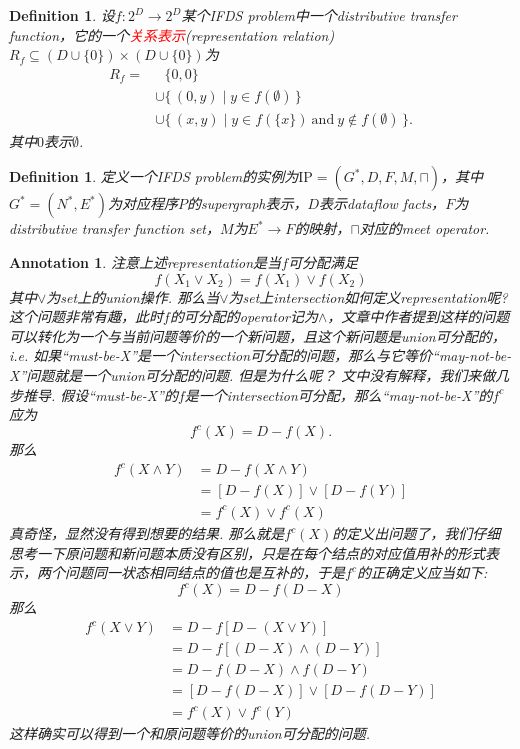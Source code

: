 \documentclass{article}
\newtheorem{definition}[theorem]{Definition}
\newtheorem{annotation}[theorem]{Annotation}
\newcommand*{\xfunc}[4]{{#2}\colon{#3}{#1}{#4}}
\newcommand*{\func}[3]{\xfunc{\to}{#1}{#2}{#3}}
\newcommand\Set[2]{\{\,#1\mid#2\,\}} %
\newcommand{\redt}[1]{\textcolor{red}{#1}}
\begin{document}
\begin{definition}
\rm 设$\func{f}{2^D}{2^D}$某个IFDS problem中一个distributive transfer function，它的一个\redt{关系表示}(representation relation) $R_f \subseteq (D \cup \{0\}) \times (D \cup \{0\})$为
$$
\begin{aligned}
R_f = &~~~ \{0,0\} \\
&\cup \Set{(0,y)}{y \in f(\emptyset)} \\ 
&\cup  \Set{(x,y)}{y \in f(\{x\})~\text{and}~y \notin f(\emptyset)}.
\end{aligned}
$$
其中$0$表示$\emptyset$. 
\end{definition}

\begin{definition}
\rm 定义一个IFDS problem的实例为$\text{IP}=(G^*,D,F,M,\sqcap)$，其中$G^*=(N^*,E^*)$为对应程序$P$的supergraph表示，$D$表示dataflow facts，$F$为distributive transfer function set，$M$为$E^* \to F$的映射，$\sqcap$对应的meet operator. 
\end{definition}

\begin{annotation}
\rm 注意上述representation是当$f$可分配满足
$$
f(X_1 \vee X_2) = f(X_1) \vee f(X_2)
$$
其中$\vee$为set上的union操作. 那么当$\vee$为set上intersection如何定义representation呢? 这个问题非常有趣，此时$f$的可分配的operator记为$\wedge$，文章中作者提到这样的问题可以转化为一个与当前问题等价的一个新问题，且这个新问题是union可分配的，i.e. 如果“must-be-X”是一个intersection可分配的问题，那么与它等价“may-not-be-X”问题就是一个union可分配的问题. 但是为什么呢？ 文中没有解释，我们来做几步推导. 假设“must-be-X”的$f$是一个intersection可分配，那么“may-not-be-X”的$f^c$应为
$$
f^c(X) = D - f(X). 
$$
那么
$$
\begin{aligned}
f^c(X \wedge Y) &= D-f(X \wedge Y)\\ 
&= [D-f(X)] \vee [D-f(Y)] \\
&= f^c(X) \vee f^c(X)
\end{aligned}
$$
真奇怪，显然没有得到想要的结果. 那么就是$f^c(X)$的定义出问题了，我们仔细思考一下原问题和新问题本质没有区别，只是在每个结点的对应值用补的形式表示，两个问题同一状态相同结点的值也是互补的，于是$f^c$的正确定义应当如下:
$$
f^c(X)= D - f(D-X)
$$
那么
$$
\begin{aligned}
f^c(X \vee Y) &= D-f[D-(X \vee Y)] \\ 
&= D-f[(D-X) \wedge (D-Y)] \\
&= D-f(D-X) \wedge f(D-Y) \\
&= [D-f(D-X)] \vee [D-f(D-Y)] \\
&= f^c(X) \vee f^c(Y) 
\end{aligned}
$$
这样确实可以得到一个和原问题等价的union可分配的问题. 
\end{annotation}
\end{document}
